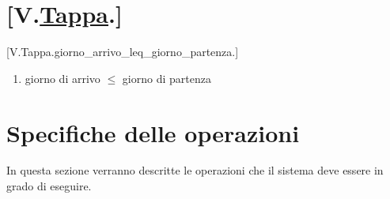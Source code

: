 \documentclass{article}
\begin{document}
\section*{[V.\hyperref[sec:Tappa]{Tappa}.]}
    [V.Tappa.giorno\_arrivo\_leq\_giorno\_partenza.]
    \begin{enumerate}
        \item giorno di arrivo $\leq$ giorno di partenza
    \end{enumerate}

\newpage
\section{Specifiche delle operazioni}

In questa sezione verranno descritte le operazioni che il sistema deve essere in grado di eseguire.
\end{document}

